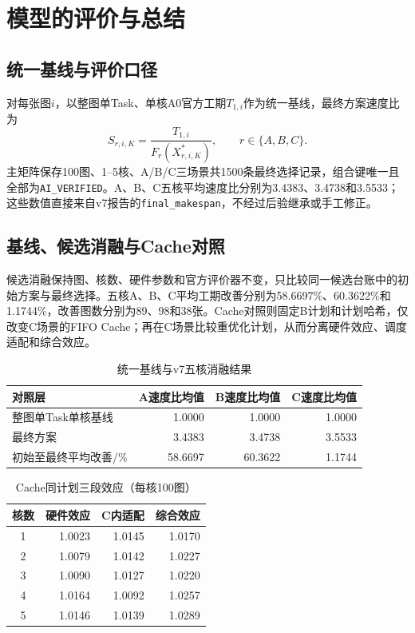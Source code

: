 \section{模型的评价与总结}
\label{sec:evaluation}

\subsection{统一基线与评价口径}
对每张图$i$，以整图单Task、单核A0官方工期$T_{1,i}$作为统一基线，最终方案速度比为
\begin{equation}
S_{r,i,K}=\frac{T_{1,i}}{F_r(X^*_{r,i,K})},\qquad r\in\{A,B,C\}.
\label{eq:eval-speedup}
\end{equation}
主矩阵保存100图、1--5核、A/B/C三场景共1500条最终选择记录，组合键唯一且全部为\texttt{AI\_VERIFIED}。A、B、C五核平均速度比分别为3.4383、3.4738和3.5533；这些数值直接来自v7报告的\texttt{final\_makespan}，不经过后验继承或手工修正。

\subsection{基线、候选消融与Cache对照}
候选消融保持图、核数、硬件参数和官方评价器不变，只比较同一候选台账中的初始方案与最终选择。五核A、B、C平均工期改善分别为58.6697\%、60.3622\%和1.1744\%，改善图数分别为89、98和38张。Cache对照则固定B计划和计划哈希，仅改变C场景的FIFO Cache；再在C场景比较重优化计划，从而分离硬件效应、调度适配和综合效应。
\begin{table}[H]\centering\small
\caption{统一基线与v7五核消融结果}\label{tab:baseline-ablation}
\begin{tabular}{lrrr}\toprule
对照层 & A速度比均值 & B速度比均值 & C速度比均值\\\midrule
整图单Task单核基线 & 1.0000 & 1.0000 & 1.0000\\
最终方案 & 3.4383 & 3.4738 & 3.5533\\
初始至最终平均改善/\% & 58.6697 & 60.3622 & 1.1744\\
\bottomrule
\end{tabular}
\end{table}

\begin{table}[H]\centering\small
\caption{Cache同计划三段效应（每核100图）}\label{tab:eval-cache-factors}
\begin{tabular}{crrr}\toprule
核数 & 硬件效应 & C内适配 & 综合效应\\\midrule
1 & 1.0023 & 1.0145 & 1.0170\\
2 & 1.0079 & 1.0142 & 1.0227\\
3 & 1.0090 & 1.0127 & 1.0220\\
4 & 1.0164 & 1.0092 & 1.0257\\
5 & 1.0146 & 1.0139 & 1.0289\\\bottomrule
\end{tabular}
\end{table}

